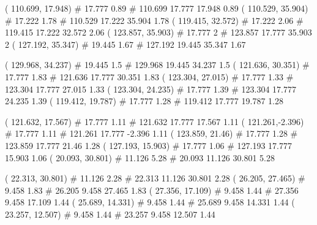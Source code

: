 \documentclass[a4paper,openbib,10pt]{article}
\newenvironment{treegraph}{\begin{graph}}{\end{graph}}
\begin{document}
\begin{treegraph}
  ( 110.699, 17.948) #     17.777    0.89
   #    110.699    17.777    17.948    0.89
  ( 110.529, 35.904) #     17.222    1.78
   #    110.529    17.222    35.904    1.78
  ( 119.415, 32.572) #     17.222    2.06
   #    119.415    17.222    32.572    2.06
  ( 123.857, 35.903) #     17.777    2
   #    123.857    17.777    35.903    2
  ( 127.192, 35.347) #     19.445    1.67
   #    127.192    19.445    35.347    1.67

  ( 129.968, 34.237) #     19.445    1.5
   #    129.968    19.445    34.237    1.5
  ( 121.636, 30.351) #     17.777    1.83
   #    121.636    17.777    30.351    1.83
  ( 123.304, 27.015) #     17.777    1.33
   #    123.304    17.777    27.015    1.33
  ( 123.304, 24.235) #     17.777    1.39
   #    123.304    17.777    24.235    1.39
  ( 119.412, 19.787) #     17.777    1.28
   #    119.412    17.777    19.787    1.28

  ( 121.632, 17.567) #     17.777    1.11
   #    121.632    17.777    17.567    1.11
  ( 121.261,-2.396) #     17.777    1.11
   #    121.261    17.777    -2.396    1.11
  ( 123.859, 21.46) #     17.777    1.28
   #    123.859    17.777    21.46    1.28
  ( 127.193, 15.903) #     17.777    1.06
   #    127.193    17.777    15.903    1.06
  ( 20.093, 30.801) #     11.126    5.28
   #    20.093    11.126    30.801    5.28

  ( 22.313, 30.801) #     11.126    2.28
   #    22.313    11.126    30.801    2.28
  ( 26.205, 27.465) #     9.458    1.83
   #    26.205    9.458    27.465    1.83
  ( 27.356, 17.109) #     9.458    1.44
   #    27.356    9.458    17.109    1.44
  ( 25.689, 14.331) #     9.458    1.44
   #    25.689    9.458    14.331    1.44
  ( 23.257, 12.507) #     9.458    1.44
   #    23.257    9.458    12.507    1.44


\end{treegraph}
\end{document}

